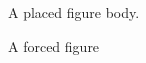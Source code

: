 \documentclass{article}
\begin{document}
\begin{figure}[H]
\centering
A placed figure body.
\caption{A forced figure}
\end{figure}
\end{document}
